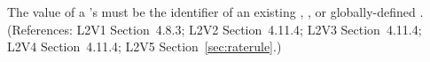 The value of a \RateRule's  must be the identifier
of an existing \Compartment, \Species, or globally-defined \Parameter.
(References: L2V1 Section~4.8.3; L2V2 Section~4.11.4; L2V3
Section~4.11.4; L2V4 Section~4.11.4; L2V5 Section~\ref{sec:raterule}.)
